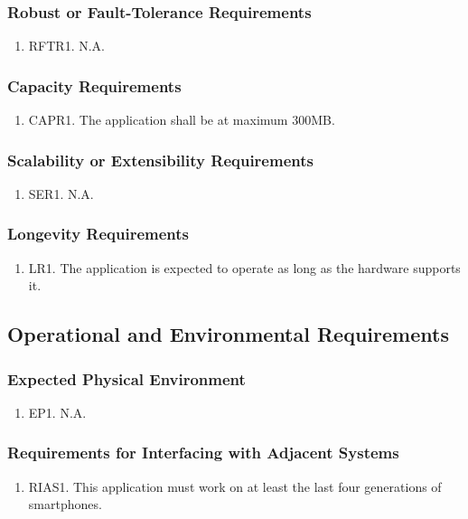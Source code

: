 \documentclass[]{article}
\begin{document}
\subsubsection{Robust or Fault-Tolerance Requirements}
\begin{enumerate}
	\item RFTR1. N.A.
\end{enumerate}

\subsubsection{Capacity Requirements}
\begin{enumerate}
	\item CAPR1. The application shall be at maximum 300MB.
\end{enumerate}

\subsubsection{Scalability or Extensibility Requirements}
\begin{enumerate}
	\item SER1. N.A.
\end{enumerate}

\subsubsection{Longevity Requirements}
\begin{enumerate}
	\item LR1. The application is expected to operate as long as the hardware supports it.
\end{enumerate}

\subsection{Operational and Environmental Requirements}
\subsubsection{Expected Physical Environment}
\begin{enumerate}
	\item EP1. N.A.
\end{enumerate}

\subsubsection{Requirements for Interfacing with Adjacent Systems}
\begin{enumerate}
	\item RIAS1. This application must work on at least the last four generations of smartphones.
\end{enumerate}
\end{document}
